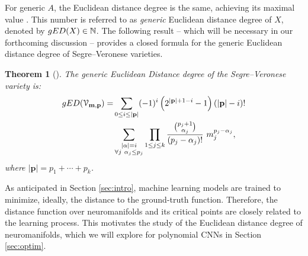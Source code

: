 \documentclass[twoside]{article}
\theoremstyle{plain}%
\newtheorem{thm}{Theorem}[section]
\theoremstyle{definition}
\theoremstyle{remark}
\newcommand{\edd}{\textnormal{gED}}
\begin{document}
For generic $A$, the Euclidean distance degree is the same, achieving its maximal value \parencite[Theorem 6.11]{draisma2016euclidean}. This number is referred to as \emph{generic} Euclidean distance degree of $X$, denoted by $\edd(X) \in \mathbb{N}$. The following result -- which will be necessary in our forthcoming discussion -- provides a closed formula for the generic Euclidean distance degree of Segre--Veronese varieties. 

\begin{thm}[\cite{kozhasov2023minimal}]\label{th:segverdeg}
The generic Euclidean Distance degree of the Segre--Veronese variety is:
\begin{align*}
    \edd(\mathcal{V}_{\mathbf{m}, \mathbf{p}}) = &\sum_{0 \leq i \leq |\mathbf{p}|} (-1)^i \left( 2^{|\mathbf{p}| + 1 - i} - 1 \right)(|\mathbf{p}| - i)! \\ 
    &\sum_{\substack{|\mathbf{\alpha}|=i \\ \forall j \ \alpha_j \leq p_j}} \prod_{1\leq j \leq k} \frac{\binom{p_j + 1}{\alpha_j}}{(p_j - \alpha_j)!} \ m_j^{p_j - \alpha_j},
\end{align*}
where $|\mathbf{p}| = p_1 + \cdots + p_{k}$. 
\end{thm}
As anticipated in Section \ref{sec:intro}, machine learning models are trained to minimize, ideally, the distance to the ground-truth function. Therefore, the distance function over neuromanifolds and its critical points are closely related to the learning process. This motivates the study of the Euclidean distance degree of neuromanifolds, which we will explore for polynomial CNNs in Section \ref{sec:optim}.  
\end{document}
